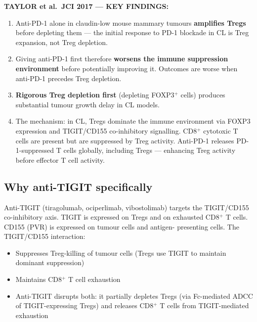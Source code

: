 \documentclass[12pt, a4paper]{article}
\begin{document}
\begin{center}
\colorbox{convergentbox}{
\begin{minipage}{0.88\textwidth}
\vspace{0.5em}
\textbf{TAYLOR et al.\ JCI 2017 --- KEY FINDINGS:}\\[0.4em]
\begin{enumerate}[noitemsep]
    \item Anti-PD-1 alone in claudin-low mouse
    mammary tumours \textbf{amplifies Tregs}
    before depleting them --- the initial
    response to PD-1 blockade in CL is Treg
    expansion, not Treg depletion.
    \item Giving anti-PD-1 first therefore
    \textbf{worsens the immune suppression
    environment} before potentially improving it.
    Outcomes are worse when anti-PD-1 precedes
    Treg depletion.
    \item \textbf{Rigorous Treg depletion first}
    (depleting FOXP3$^+$ cells) produces
    substantial tumour growth delay in CL
    models.
    \item The mechanism: in CL, Tregs dominate
    the immune environment via FOXP3 expression
    and TIGIT/CD155 co-inhibitory signalling.
    CD8$^+$ cytotoxic T cells are present but
    are suppressed by Treg activity. Anti-PD-1
    releases PD-1-suppressed T cells globally,
    including Tregs --- enhancing Treg activity
    before effector T cell activity.
\end{enumerate}
\vspace{0.5em}
\end{minipage}}
\end{center}

\subsection{Why anti-TIGIT specifically}

Anti-TIGIT (tiragolumab, ociperlimab, vibostolimab)
targets the TIGIT/CD155 co-inhibitory axis. TIGIT
is expressed on Tregs and on exhausted CD8$^+$ T cells.
CD155 (PVR) is expressed on tumour cells and antigen-
presenting cells. The TIGIT/CD155 interaction:

\begin{itemize}
    \item Suppresses Treg-killing of tumour cells
    (Tregs use TIGIT to maintain dominant
    suppression)
    \item Maintains CD8$^+$ T cell exhaustion
    \item Anti-TIGIT disrupts both: it partially
    depletes Tregs (via Fc-mediated ADCC of
    TIGIT-expressing Tregs) and releases CD8$^+$
    T cells from TIGIT-mediated exhaustion
\end{itemize}
\end{document}

